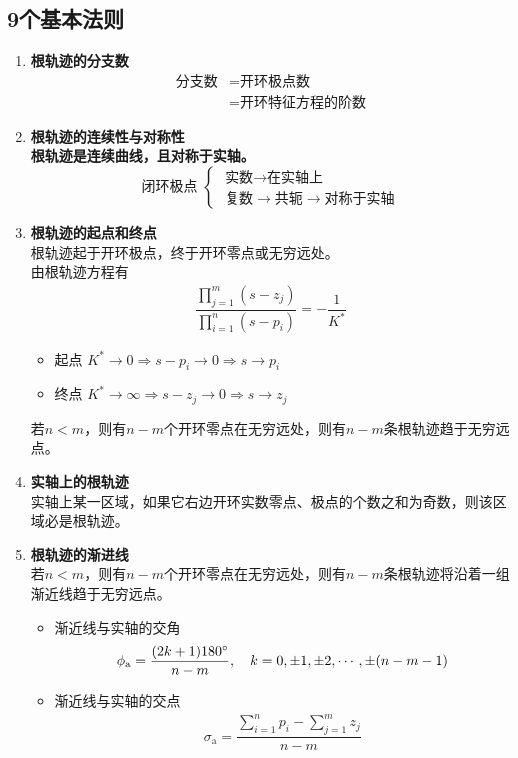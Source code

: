\subsection{9个基本法则}
\begin{enumerate}
	\item \textbf{根轨迹的分支数}
	\begin{align*}
		\mbox{分支数} &= \mbox{开环极点数}\\
		&=\mbox{开环特征方程的阶数}
	\end{align*}
	\item \textbf{根轨迹的连续性与对称性}\\
	\textbf{根轨迹是连续曲线，且对称于实轴。}
	\begin{equation*}
		\mbox{闭环极点} \,\,
		\begin{cases}
			\,\,\mbox{实数} \longrightarrow \mbox{在实轴上}\\
			\,\,\mbox{复数} \longrightarrow \mbox{共轭} \longrightarrow \mbox{对称于实轴}
		\end{cases}
	\end{equation*}
	
	\item \textbf{根轨迹的起点和终点}\\
	根轨迹起于开环极点，终于开环零点或无穷远处。\\
	由根轨迹方程有
	\begin{align*}
		\dfrac{\displaystyle \prod_{j = 1}^{m}(s - z_j)}{\displaystyle \prod_{i = 1}^{n} (s - p_i)} = - \dfrac{1}{K^*}
	\end{align*}
	\begin{itemize}
		\item 起点 \quad $K^* \to 0 \Rightarrow s - p_i \to 0 \Rightarrow s \to p_i$
		\item 终点 \quad $K^* \to \infty \Rightarrow s - z_j \to 0 \Rightarrow s \to z_j$
	\end{itemize}
	若$n < m$，则有$n - m$个开环零点在无穷远处，则有$n - m$条根轨迹趋于无穷远点。
	\item \textbf{实轴上的根轨迹}\\
	实轴上某一区域，如果它右边开环实数零点、极点的个数之和为奇数，则该区域必是根轨迹。
	\item \textbf{根轨迹的渐进线}\\
	若$n < m$，则有$n - m$个开环零点在无穷远处，则有$n - m$条根轨迹将沿着一组渐近线趋于无穷远点。
	\begin{itemize}
		\item 渐近线与实轴的交角
		\begin{align}
			\phi_\text{a} = \dfrac{(2k+1) 180 {}^{\circ}}{n-m}, \quad k = 0,\pm 1,\pm 2, \cdots,\pm (n-m-1)
		\end{align}
		\item 渐近线与实轴的交点
		\begin{align}
			\sigma_\text{a} = \dfrac{\displaystyle \sum_{i =1}^n p_i - \sum_{j = 1}^m z_j}{n-m}
		\end{align}
	\end{itemize}
	

\end{enumerate}
